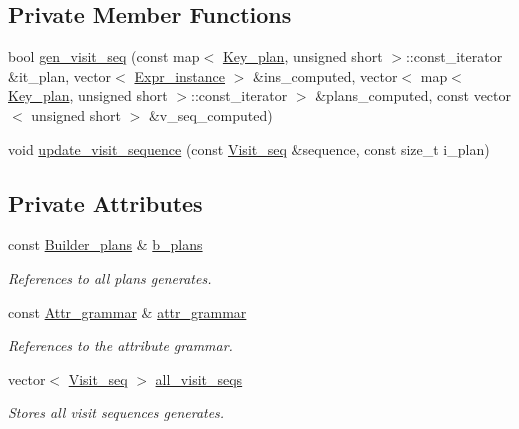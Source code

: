 \subsection*{Private Member Functions}
\begin{DoxyCompactItemize}
\item 
bool \hyperlink{classgenevalmag_1_1Builder__visit__sequences_a81498899f7859f929abb96526f20e4a3}{gen\_\-visit\_\-seq} (const map$<$ \hyperlink{structgenevalmag_1_1k__plan}{Key\_\-plan}, unsigned short $>$::const\_\-iterator \&it\_\-plan, vector$<$ \hyperlink{classgenevalmag_1_1Expr__instance}{Expr\_\-instance} $>$ \&ins\_\-computed, vector$<$ map$<$ \hyperlink{structgenevalmag_1_1k__plan}{Key\_\-plan}, unsigned short $>$::const\_\-iterator $>$ \&plans\_\-computed, const vector$<$ unsigned short $>$ \&v\_\-seq\_\-computed)
\item 
void \hyperlink{classgenevalmag_1_1Builder__visit__sequences_aeb3f3076ab75a8869785d98c0c3bcdf2}{update\_\-visit\_\-sequence} (const \hyperlink{namespacegenevalmag_a7720677d79b33ecca4db21cdbcf7908f}{Visit\_\-seq} \&sequence, const size\_\-t i\_\-plan)
\end{DoxyCompactItemize}
\subsection*{Private Attributes}
\begin{DoxyCompactItemize}
\item 
const \hyperlink{classgenevalmag_1_1Builder__plans}{Builder\_\-plans} \& \hyperlink{classgenevalmag_1_1Builder__visit__sequences_accdb8c83f0540acd32f2ee461c9b2fbe}{b\_\-plans}
\begin{DoxyCompactList}\small\item\em References to all plans generates. \item\end{DoxyCompactList}\item 
const \hyperlink{classgenevalmag_1_1Attr__grammar}{Attr\_\-grammar} \& \hyperlink{classgenevalmag_1_1Builder__visit__sequences_a2eb7705741cd581ed968e0bc6127b3fd}{attr\_\-grammar}
\begin{DoxyCompactList}\small\item\em References to the attribute grammar. \item\end{DoxyCompactList}\item 
vector$<$ \hyperlink{namespacegenevalmag_a7720677d79b33ecca4db21cdbcf7908f}{Visit\_\-seq} $>$ \hyperlink{classgenevalmag_1_1Builder__visit__sequences_aba229b62df85d994ce9a5da960c1273a}{all\_\-visit\_\-seqs}
\begin{DoxyCompactList}\small\item\em Stores all visit sequences generates. \item\end{DoxyCompactList}\end{DoxyCompactItemize}


